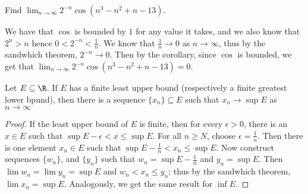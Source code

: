 \begin{example}
    Find $\lim_{n \rightarrow \infty} 2^{-n}\cos(n^3-n^2+n-13)$.
\end{example}
\begin{solution}
    We have that $\cos$ is bounded by $1$ for any value it takes, and we also know that  $2^n>n$ hence  $0<2^{-n}<\frac{1}{n}$.
    We know that $\frac{1}{n} \rightarrow 0$ as $n \rightarrow \infty$, thus by the sandwhich theorem,  $2^{-n} \rightarrow 0$.
    Then by the corollary, since  $\cos$ is bounded, we get that $\lim_{n \rightarrow \infty} 2^{-n}\cos(n^3-n^2+n-13)=0$.

\end{solution}

\begin{theorem}\label{2.2.2}

    Let $E \subseteq \R$. If  $E$ has a finite least upper bound  (respectively a finite greatest lower bpund), then there is 
    a sequence $\{x_n\} \subseteq E$ such that  $x_n \rightarrow \sup{E}$ as  $n \rightarrow \infty$
\end{theorem}
\begin{proof}
    If the least upper bound of $E$ is finite, then for every  $\epsilon>0$, there is an  $x \in E$ such that  
    $\sup{E}-\epsilon < x \leq \sup{E}$. For all  $n \geq N$, choose  $\epsilon=\frac{1}{n}$. Then there is one element 
    $x_n \in E$ such that  $\sup{E}-\frac{1}{n}<x_n \leq \sup{E}$. Now construct sequences $\{w_n\}$, and  $\{y_n\}$ such 
    that $w_n=\sup{E}-\frac{1}{n}$ and $y_n=\sup{E}$. Then $\lim{w_n}=\lim{y_n}=\sup{E}$ and  $w_n<x_n \leq y_n$; thus by the 
    sandwhich theorem,  $\lim{x_n}=\sup{E}$. Analogously, we get the same result for $\inf{E}$.
\end{proof}

